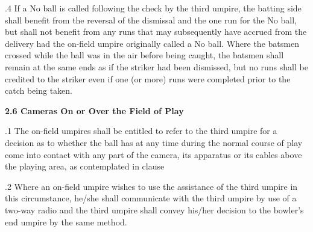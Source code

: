 \documentclass[12pt]{article}
\begin{document}
\vspace{\baselineskip}
\begin{adjustwidth}{0.5in}{0.01in}
{\fontsize{9pt}{10.8pt}.4 \tabto{0.49in} If a No ball is called following the check by the third umpire, the batting side shall benefit from the reversal of the dismissal and the one run for the No ball, but shall not benefit from any runs that may subsequently have accrued from the delivery had the on-field umpire originally called a No ball. Where the batsmen crossed while the ball was in the air before being caught, the batsmen shall remain at the same ends as if the striker had been dismissed, but no runs shall be credited to the striker even if one (or more) runs were completed prior to the catch being taken.\par}\par

\end{adjustwidth}


\vspace{\baselineskip}
{\fontsize{11pt}{13.2pt}\selectfont \textbf{2.6 \tabto{0.47in} Cameras On or Over the Field of Play}\par}\par


\vspace{\baselineskip}
\begin{adjustwidth}{0.5in}{0.07in}
\begin{justify}
{\fontsize{9pt}{10.8pt}.1 \tabto{0.49in} The on-field umpires shall be entitled to refer to the third umpire for a decision as to whether the ball has at any time during the normal course of play come into contact with any part of the camera, its apparatus or its cables above the playing area, as contemplated in clause \par}
\end{justify}\par

\end{adjustwidth}


\vspace{\baselineskip}
\begin{adjustwidth}{0.5in}{0.07in}
{\fontsize{9pt}{10.8pt}.2 \tabto{0.49in} Where an on-field umpire wishes to use the assistance of the third umpire in this circumstance, he/she shall communicate with the third umpire by use of a two-way radio and the third umpire shall convey his/her decision to the bowler’s end umpire by the same method.\par}\par

\end{adjustwidth}
\end{document}
